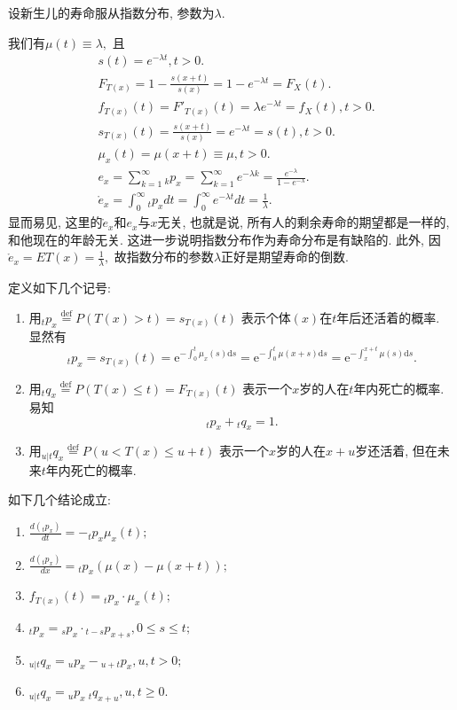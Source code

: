 \documentclass[lang=cn,10pt]{elegantbook}
\begin{document}
\begin{example}
    设新生儿的寿命服从指数分布, 参数为$\lambda$.
\end{example}
\begin{solution}
	我们有$\mu(t)\equiv\lambda,$ 且
    \begin{align*}
         & s(t)=e^{-\lambda t},t>0.  \\
         & F_{T(x)}=1-\frac{s(x+t)}{s(x)}=1-e^{- \lambda t}=F_X(t).   \\
         & f_{T(x)}(t)={F'}_{T(x)}(t)=\lambda e^{- \lambda t}=f_X(t),t>0.  \\
         & s_{T(x)}(t)=\frac{s(x+t)}{s(x)}=e^{-\lambda t}=s(t),t>0. \\
         & \mu_x(t)=\mu(x+t)\equiv\mu,t>0. \\
         & e_x = \sum_{k=1}^{\infty} {_kp_x}=\sum_{k=1}^{\infty} {e^{- \lambda k}}=\frac{e^{- \lambda}}{1-e^{- \lambda}}. \\
         & \mathring{e}_x=\int_{0}^{\infty}{_tp_x}dt=\int_{0}^{\infty}{e^{- \lambda t}}dt=\frac{1}{\lambda}.
    \end{align*}
    显而易见, 这里的$\mathring e_x $和$e_x$与$x$无关, 也就是说,  所有人的剩余寿命的期望都是一样的, 和他现在的年龄无关. 这进一步说明指数分布作为寿命分布是有缺陷的.   此外, 因$\mathring{e}_x=ET(x)=\frac{1}{\lambda},$ 故指数分布的参数$\lambda$正好是期望寿命的倒数.
\end{solution}

\begin{proposition}
	定义如下几个记号:
\begin{enumerate}
    \item 用$_tp_{x}\stackrel{\text{def}}{=}P(T(x)>t)=s_{T(x)}(t)$
        表示个体$(x)$在$t$年后还活着的概率. 显然有
        $$ {}_tp_x=s_{T(x)}(t)=\mathrm{e}^{-\int_{0}^{t}\mu_x(s)\mathrm{d}s}=\mathrm{e}^{-\int_{0}^{t}\mu(x+s)\mathrm{d}s}=\mathrm{e}^{-\int_{x}^{x+t}\mu(s)\mathrm{d}s}.$$
    \item 用$_tq_{x}\stackrel{\text{def}}{=}P(T(x)\leq t)=F_{T(x)}(t)$
        表示一个$x$岁的人在$t$年内死亡的概率. 易知
        $$_tp_{x}+{}_tq_{x}=1.$$
    \item 用$ _{u|t}q_x\stackrel{\text{def}}{=}P(u<T(x)\leq u+t)$
        表示一个$x$岁的人在$x+u$岁还活着, 但在未来$t$年内死亡的概率.
\end{enumerate}
\end{proposition}

\begin{corollary}
如下几个结论成立:
\begin{enumerate}
	\item $\frac{d(_tp_x)}{dt}=-_tp_x\mu_x(t);$
	\item $\frac{d(_tp_x)}{dx}= {}_tp_x(\mu(x)-\mu(x+t));$
	\item $f_{T(x)}(t)={}_tp_x\cdot \mu_x(t);$
    \item $_tp_x={}_sp_x\cdot{}_{t-s}p_{x+s},0\leq s\leq t;$
	\item ${}_{u|t}q_x={}_up_x-{}_{u+t}p_x, u,t>0;$
	\item ${}_{u|t}q_x={}_up_x~{}_{t}q_{x+u},u,t\ge0.$
\end{enumerate}
\end{corollary}
\end{document}
